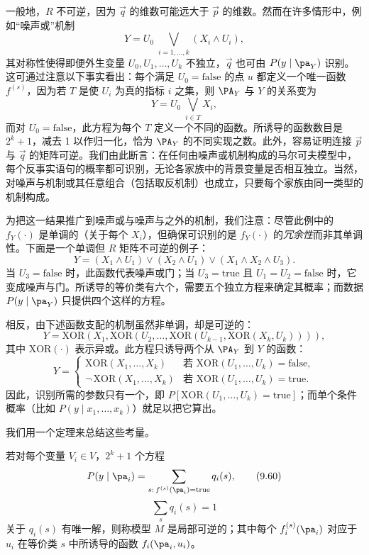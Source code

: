 一般地，$R$ 不可逆，因为 $\vec{q}$ 的维数可能远大于 $\vec{p}$ 的维数。然而在许多情形中，例如“噪声或”机制
\begin{equation}
Y=U_0\;\bigvee_{i=1,\dots,k}(X_i\wedge U_i), \tag{9.58}
\end{equation}
其对称性使得即便外生变量 $U_0,U_1,\dots,U_k$ 不独立，$\vec{q}$ 也可由 $P(y\mid\pa_Y)$ 识别。这可通过注意以下事实看出：每个满足 $U_0=\text{false}$ 的点 $u$ 都定义一个唯一函数 $f^{(s)}$，因为若 $T$ 是使 $U_i$ 为真的指标 $i$ 之集，则 $\PA_Y$ 与 $Y$ 的关系变为
\begin{equation}
Y=U_0\;\bigvee_{i\in T}X_i, \tag{9.59}
\end{equation}
而对 $U_0=\text{false}$，此方程为每个 $T$ 定义一个不同的函数。所诱导的函数数目是 $2^k+1$，减去 1 以作归一化，恰为 $\PA_Y$ 的不同实现之数。此外，容易证明连接 $\vec{p}$ 与 $\vec{q}$ 的矩阵可逆。我们由此断言：在任何由噪声或机制构成的马尔可夫模型中，每个反事实语句的概率都可识别，无论各家族中的背景变量是否相互独立。当然，对噪声与机制或其任意组合（包括取反机制）也成立，只要每个家族由同一类型的机制构成。

为把这一结果推广到噪声或与噪声与之外的机制，我们注意：尽管此例中的 $f_Y(\cdot)$ 是单调的（关于每个 $X_i$），但确保可识别的是 $f_Y(\cdot)$ 的\emph{冗余性}而非其单调性。下面是一个单调但 $R$ 矩阵不可逆的例子：
\[
Y=(X_1\wedge U_1)\vee(X_2\wedge U_1)\vee(X_1\wedge X_2\wedge U_3).
\]
当 $U_3=\text{false}$ 时，此函数代表噪声或门；当 $U_3=\text{true}$ 且 $U_1=U_2=\text{false}$ 时，它变成噪声与门。所诱导的等价类有六个，需要五个独立方程来确定其概率；而数据 $P(y\mid\pa_Y)$ 只提供四个这样的方程。

相反，由下述函数支配的机制虽然非单调，却是可逆的：
\[
Y=\mathrm{XOR}(X_1,\mathrm{XOR}(U_2,\dots,\mathrm{XOR}(U_{k-1},\mathrm{XOR}(X_k,U_k)))),
\]
其中 $\mathrm{XOR}(\cdot)$ 表示异或。此方程只诱导两个从 $\PA_Y$ 到 $Y$ 的函数：
\[
Y=\begin{cases}
\mathrm{XOR}(X_1,\dots,X_k) & \text{若 } \mathrm{XOR}(U_1,\dots,U_k)=\text{false},\\
\neg\,\mathrm{XOR}(X_1,\dots,X_k) & \text{若 } \mathrm{XOR}(U_1,\dots,U_k)=\text{true}.
\end{cases}
\]
因此，识别所需的参数只有一个，即 $P[\mathrm{XOR}(U_1,\dots,U_k)=\text{true}]$；而单个条件概率（比如 \mbox{$P(y\mid x_1,\dots,x_k)$}）就足以把它算出。

我们用一个定理来总结这些考量。

\begin{definition}[局部可逆性]
若对每个变量 $V_i\in V$，$2^k+1$ 个方程
\begin{equation}
P(y\mid\pa_i)=\sum_{s:\,f^{(s)}(\pa_i)=\text{true}}q_i(s), \tag{9.60}
\end{equation}
\begin{equation}
\sum_s q_i(s)=1 \tag{9.61}
\end{equation}
关于 $q_i(s)$ 有唯一解，则称模型 $M$ 是局部可逆的；其中每个 $f_i^{(s)}(\pa_i)$ 对应于 $u_i$ 在等价类 $s$ 中所诱导的函数 $f_i(\pa_i,u_i)$。
\end{definition}

